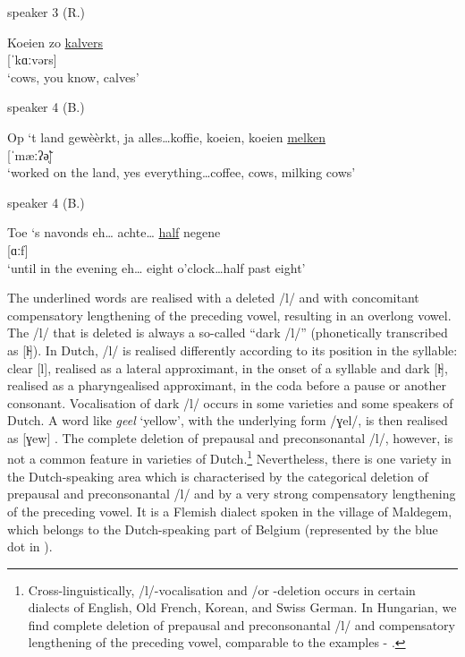 \documentclass[output=paper,hidelinks,draftmode]{langscibook}
\begin{document}
\z 

\ea speaker 3 (R.)
\label{ex:schaffel:4}

\gll Koeien zo \ul{kalvers} \\
{} {} [ˈkɑːvərs]\\
\glt ‘cows, you know, calves’

\z 

\ea speaker 4 (B.)
\label{ex:schaffel:5}

\gll Op ‘t land gewèèrkt, ja alles…koffie, koeien, koeien \ul{melken}\\
{} {} {} {} {} {} {} {} [ˈmæːʔ\~{ə̩}]\\
\glt ‘worked on the land, yes everything…coffee, cows, milking cows’

\z 


\ea speaker 4 (B.)
\label{ex:schaffel:6}

\gll Toe ‘s navonds eh{\ldots} achte{\ldots} \uline{half} negene \\
  {}  {} {}      {}         {}              [ɑːf]           {}\\
\glt ‘until in the evening eh… eight o’clock\ldots half past eight’
\z 

\hspace*{-1mm}The underlined words are realised with a deleted /l/ and with concomitant compensatory lengthening of the preceding vowel, resulting in an overlong vowel. The /l/ that is deleted is always a so-called ``dark /l/'' (phonetically transcribed as [l̴]). In Dutch, /l/ is realised differently according to its position in the syllable: clear [l], realised as a lateral approximant, in the onset of a syllable and dark [l̴], realised as a pharyngealised approximant, in the coda before a pause or another consonant. Vocalisation of dark /l/ occurs in some varieties and some speakers of Dutch. A word like \textit{geel} ‘yellow’, with the underlying form /ɣel/, is then realised as [ɣew] \citep[17]{VanReenen1986, BotmaTorre2000}. The complete deletion of prepausal and preconsonantal /l/, however, is not a common feature in varieties of Dutch.\footnote{Cross-linguistically, /l/-vocalisation and /or -deletion occurs in certain dialects of English, Old French, Korean, and Swiss German. In Hungarian, we find complete deletion of prepausal and preconsonantal /l/ and compensatory lengthening of the preceding vowel, comparable to the examples - \citep{Feyer2012}.} Nevertheless, there is one variety in the Dutch-speaking area which is characterised by the categorical deletion of prepausal and preconsonantal /l/ and by a very strong compensatory lengthening of the preceding vowel. It is a Flemish dialect spoken in the village of Maldegem, which belongs to the Dutch-speaking part of Belgium (represented by the blue dot in ).
\end{document}
